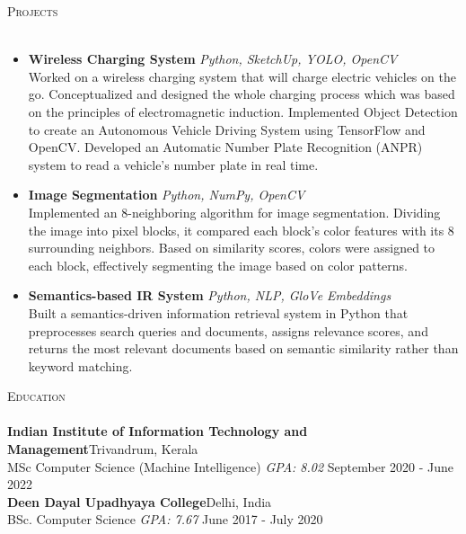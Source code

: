 \documentclass[a4paper]{article}
\newcommand{\lineunder} {
    \vspace*{-8pt} \\
    \hspace*{-18pt} \hrulefill \\
}
\newcommand{\header} [1] {
    {\hspace*{-18pt}\vspace*{6pt} \textsc{#1}}
    \vspace*{-6pt} \lineunder
}
\begin{document}
\vspace{1.5mm}


\header{Projects}
\begin{itemize}
    \item {\textbf{Wireless Charging System}} {\sl Python, SketchUp, YOLO, OpenCV} \\
Worked on a wireless charging system that will charge electric vehicles on the go. Conceptualized and designed the whole charging process which was based on the principles of electromagnetic induction. Implemented Object Detection to create an Autonomous Vehicle Driving System using TensorFlow and OpenCV. Developed an Automatic Number Plate Recognition (ANPR) system to read a vehicle’s number plate in real time.\\
    \item {\textbf{Image Segmentation}} {\sl Python, NumPy, OpenCV} \href{https://github.com/ctrl-infinity/custom_image_segmentation}{\faGithub} \\
Implemented an 8-neighboring algorithm for image segmentation. Dividing the image into pixel blocks, it compared each block's color features with its 8 surrounding neighbors. Based on similarity scores, colors were assigned to each block, effectively segmenting the image based on color patterns.\\
    \item {\textbf{Semantics-based IR System}} {\sl Python, NLP, GloVe Embeddings} \\
Built a semantics-driven information retrieval system in Python that preprocesses search queries and documents, assigns relevance scores, and returns the most relevant documents based on semantic similarity rather than keyword matching.\\
\end{itemize}


\header{Education}
\textbf{Indian Institute of Information Technology and Management}\hfill Trivandrum, Kerala\\
MSc Computer Science (Machine Intelligence) \textit{GPA: 8.02} \hfill September 2020 - June 2022\\
\vspace{2mm}
\textbf{Deen Dayal Upadhyaya College}\hfill Delhi, India\\
BSc. Computer Science \textit{GPA: 7.67} \hfill June 2017 - July 2020\\
\vspace{2mm}

\vspace{2mm}
\end{document}
